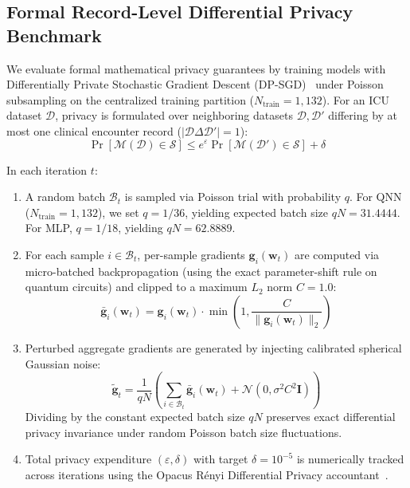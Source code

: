 \documentclass[conference]{IEEEtran}
\begin{document}
\subsection{Formal Record-Level Differential Privacy Benchmark}
We evaluate formal mathematical privacy guarantees by training models with Differentially Private Stochastic Gradient Descent (\textsf{DP-SGD})~\cite{abadi2016deep} under Poisson subsampling on the centralized training partition ($N_{\text{train}} = 1,132$). For an ICU dataset $\mathcal{D}$, privacy is formulated over neighboring datasets $\mathcal{D}, \mathcal{D}'$ differing by at most one clinical encounter record ($|\mathcal{D} \Delta \mathcal{D}'| = 1$):
\begin{equation}
    \Pr[\mathcal{M}(\mathcal{D}) \in \mathcal{S}] \le e^\varepsilon \Pr[\mathcal{M}(\mathcal{D}') \in \mathcal{S}] + \delta
\end{equation}

In each iteration $t$:
\begin{enumerate}
    \item A random batch $\mathcal{B}_t$ is sampled via Poisson trial with probability $q$. For QNN ($N_{\text{train}} = 1,132$), we set $q = 1/36$, yielding expected batch size $qN = 31.4444$. For MLP, $q = 1/18$, yielding $qN = 62.8889$.
    \item For each sample $i \in \mathcal{B}_t$, per-sample gradients $\mathbf{g}_i(\mathbf{w}_t)$ are computed via micro-batched backpropagation (using the exact parameter-shift rule on quantum circuits) and clipped to a maximum $L_2$ norm $C = 1.0$:
    \begin{equation}
        \bar{\mathbf{g}}_i(\mathbf{w}_t) = \mathbf{g}_i(\mathbf{w}_t) \cdot \min\left(1, \frac{C}{\|\mathbf{g}_i(\mathbf{w}_t)\|_2}\right)
    \end{equation}
    \item Perturbed aggregate gradients are generated by injecting calibrated spherical Gaussian noise:
    \begin{equation}
        \tilde{\mathbf{g}}_t = \frac{1}{qN} \left( \sum_{i \in \mathcal{B}_t} \bar{\mathbf{g}}_i(\mathbf{w}_t) + \mathcal{N}\left(0, \sigma^2 C^2 \mathbf{I}\right) \right)
    \end{equation}
    Dividing by the constant expected batch size $qN$ preserves exact differential privacy invariance under random Poisson batch size fluctuations.
    \item Total privacy expenditure $(\varepsilon, \delta)$ with target $\delta = 10^{-5}$ is numerically tracked across iterations using the Opacus Rényi Differential Privacy accountant~\cite{mironov2017renyi,yousefpour2021opacus}.
\end{enumerate}
\end{document}
